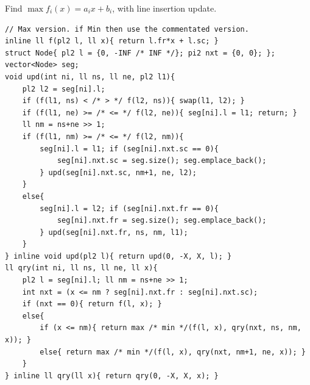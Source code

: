 Find $\max f_i(x) = a_ix + b_i$, with line insertion update.

\begin{verbatim}
// Max version. if Min then use the commentated version.
inline ll f(pl2 l, ll x){ return l.fr*x + l.sc; }
struct Node{ pl2 l = {0, -INF /* INF */}; pi2 nxt = {0, 0}; };
vector<Node> seg;
void upd(int ni, ll ns, ll ne, pl2 l1){
	pl2 l2 = seg[ni].l;
	if (f(l1, ns) < /* > */ f(l2, ns)){ swap(l1, l2); }
	if (f(l1, ne) >= /* <= */ f(l2, ne)){ seg[ni].l = l1; return; }
	ll nm = ns+ne >> 1;
	if (f(l1, nm) >= /* <= */ f(l2, nm)){
		seg[ni].l = l1; if (seg[ni].nxt.sc == 0){
			seg[ni].nxt.sc = seg.size(); seg.emplace_back();
		} upd(seg[ni].nxt.sc, nm+1, ne, l2);
	}
	else{
		seg[ni].l = l2; if (seg[ni].nxt.fr == 0){
			seg[ni].nxt.fr = seg.size(); seg.emplace_back();
		} upd(seg[ni].nxt.fr, ns, nm, l1);
	}
} inline void upd(pl2 l){ return upd(0, -X, X, l); }
ll qry(int ni, ll ns, ll ne, ll x){
	pl2 l = seg[ni].l; ll nm = ns+ne >> 1;
	int nxt = (x <= nm ? seg[ni].nxt.fr : seg[ni].nxt.sc);
	if (nxt == 0){ return f(l, x); }
	else{
		if (x <= nm){ return max /* min */(f(l, x), qry(nxt, ns, nm, x)); }
		else{ return max /* min */(f(l, x), qry(nxt, nm+1, ne, x)); }
	}
} inline ll qry(ll x){ return qry(0, -X, X, x); }
\end{verbatim}